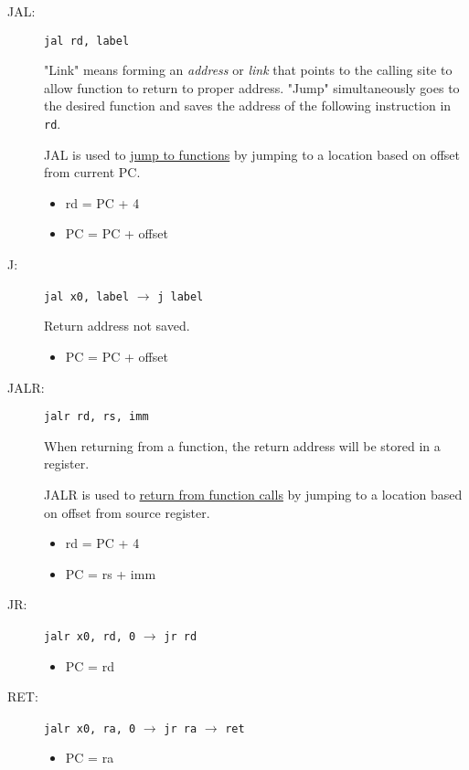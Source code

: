 \begin{description}
    \item[JAL:] \texttt{jal rd, label}
    
    "Link" means forming an \emph{address} or \emph{link} that points to the calling site to allow function to return to proper address. "Jump" simultaneously goes to the desired function and saves the address of the following instruction in \texttt{rd}.
    
    JAL is used to \underline{jump to functions} by jumping to a location based on offset from current PC.
    \begin{itemize}
        \item rd = PC + 4
        \item PC = PC + offset
    \end{itemize}
    
    \item[J:] \texttt{jal x0, label} $\rightarrow$ \texttt{j label}
    
    Return address not saved.
    \begin{itemize}
        \item PC = PC + offset
    \end{itemize}
    
    \item[JALR:] \texttt{jalr rd, rs, imm}
    
    When returning from a function, the return address will be stored in a register.
    
    JALR is used to \underline{return from function calls} by jumping to a location based on offset from source register. 
    \begin{itemize}
        \item rd = PC + 4
        \item PC = rs + imm
    \end{itemize}
    
    \item[JR:] \texttt{jalr x0, rd, 0} $\rightarrow$ \texttt{jr rd}
    
    \begin{itemize}
        \item PC = rd
    \end{itemize}
    
    \item[RET:] \texttt{jalr x0, ra, 0} $\rightarrow$ \texttt{jr ra} $\rightarrow$ \texttt{ret}
    
    \begin{itemize}
        \item PC = ra
    \end{itemize}
\end{description}


